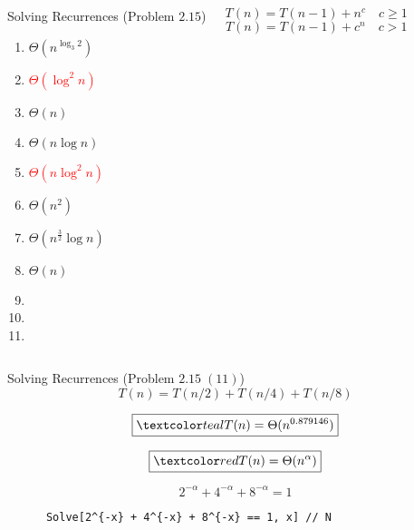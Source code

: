 \begin{frame}{}
  \begin{columns}
      \begin{exampleblock}{Solving Recurrences (Problem $2.15$)}
	\begin{enumerate}[(1)]
	  \item $\Theta(n^{\log_3 2})$
	  \item \textcolor{red}{$\Theta(\log^2 n)$}
	  \item $\Theta(n)$
	  \item $\Theta(n \log n)$
	  \item \textcolor{red}{$\Theta(n \log^2 n)$}
	  \item $\Theta(n^2)$
	  \item $\Theta(n^{\frac{3}{2}}\log n)$
	  \item $\Theta(n)$
	  \item {}
	  \item {}
	  \item \purple{$\cdots$}
	\end{enumerate}
      \end{exampleblock}
      \[
	T(n) = T(n-1) + n^c \quad c \ge 1
      \]
      \[
	T(n) = T(n-1) + c^n \quad c > 1
      \]
  \end{columns}
\end{frame}

\begin{frame}[fragile]{}
  \begin{exampleblock}{Solving Recurrences (Problem $2.15\; (11)$)}
    \[
      T(n) = T(n/2) + T(n/4) + T(n/8)
    \]
  \end{exampleblock}

  \pause
  \[
    \boxed{\teal{T(n) = \Theta(n^{0.879146})}}
  \]

  \pause
  \vspace{0.30cm}
  \[
    \boxed{\red{T(n) = \Theta(n^\alpha)}}
  \]

  \pause
  \[
    2^{-\alpha} + 4^{-\alpha} + 8^{-\alpha} = 1
  \]

  \pause
  \begin{center}
    \begin{verbatim}
      Solve[2^{-x} + 4^{-x} + 8^{-x} == 1, x] // N
    \end{verbatim}
  \end{center}
\end{frame}

